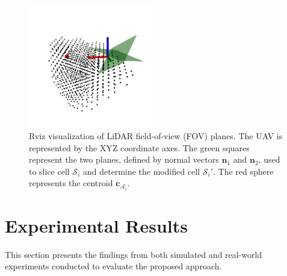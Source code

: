             \begin{figure}[H]
                \centering
                \includegraphics[width=0.48\textwidth]{./fig/rviz/cell_a_sliced_with_planes.png}
                \caption{
                    Rviz visualization of LiDAR field-of-view (FOV) planes. The \ac{UAV} is represented by the XYZ coordinate axes. 
                    The green squares represent the two planes, defined by normal vectors $\mathbf{n}_1$ and $\mathbf{n}_2$, used to slice cell $\mathcal{S}_i$ and determine the modified cell $\mathcal{S}_i'$.
                    The red sphere represents the centroid $\mathbf{c}_{\mathcal{A}_i}$.
                }
                \label{fig:cell_a_sliced}
            \end{figure}
    
    \section{Experimental Results}
    \label{sec:experimental_results}
        This section presents the findings from both simulated and real-world experiments conducted to evaluate the proposed approach.
